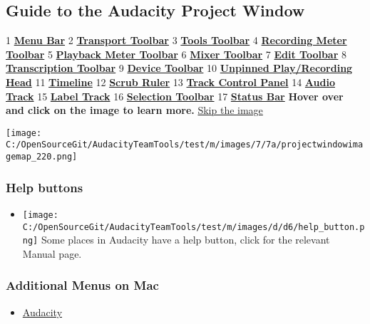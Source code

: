 \begin{multicols}{2}
\subsection{Guide to the Audacity Project Window}
\label{index:reference}1\textbf{
\hyperref[\foo{man:menu:reference:}]{Menu Bar}
}2\textbf{
\hyperref[\foo{man:transport:toolbar:}]{Transport Toolbar}
}3\textbf{
\hyperref[\foo{man:tools:toolbar:}]{Tools Toolbar}
}4\textbf{
\hyperref[\foo{man:meter:toolbar:recording}]{Recording Meter Toolbar}
}5\textbf{
\hyperref[\foo{man:meter:toolbar:playback}]{Playback Meter Toolbar}
}6\textbf{
\hyperref[\foo{man:mixer:toolbar:}]{Mixer Toolbar}
}7\textbf{
\hyperref[\foo{man:edit:toolbar:}]{Edit Toolbar}
}8\textbf{
\hyperref[\foo{man:transcription:toolbar:}]{Transcription Toolbar}
}9\textbf{
\hyperref[\foo{man:device:toolbar:}]{Device Toolbar}
}10\textbf{
\hyperref[\foo{man:timeline:pinned}]{Unpinned Play/Recording Head}
}11\textbf{
\hyperref[\foo{man:timeline:}]{Timeline}
}12\textbf{
\hyperref[\foo{man:scrubbing:and:seeking:scrubbing}]{Scrub Ruler}
}13\textbf{
\hyperref[\foo{man:track:control:panel:and:vertical:scale:}]{Track Control Panel}
}14\textbf{
\hyperref[\foo{man:audio:tracks:}]{Audio Track}
}15\textbf{
\hyperref[\foo{man:label:tracks:}]{Label Track}
}16\textbf{
\hyperref[\foo{man:selection:toolbar:}]{Selection Toolbar}
}17\textbf{
\hyperref[\foo{man:status:bar:}]{Status Bar}
}\textbf{Hover over and click on the image to learn more.}
\hyperref[\foo{index::skiptheimage}]{Skip the image}
\par \texorpdfstring{\protect\texttt{[image: C:/OpenSourceGit/AudacityTeamTools/test/m/images/7/7a/projectwindowimagemap\_220.png]}}{}\par 
\subsubsection{Help buttons}
\begin{itemize}
\item \texorpdfstring{\protect\texttt{[image: C:/OpenSourceGit/AudacityTeamTools/test/m/images/d/d6/help\_button.png]}}{} Some places in Audacity have a help button, click for the relevant Manual page.
\end{itemize}

\subsubsection{Additional Menus on Mac}
\begin{itemize}
\item 
\hyperref[\foo{man:audacity:menu:}]{Audacity}


\end{itemize}
\end{multicols}
